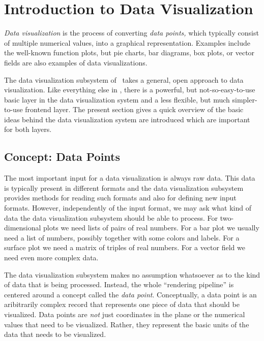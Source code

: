 %
%
%


\section{Introduction to Data Visualization}


\emph{Data visualization} is the process of converting \emph{data
  points,} which typically consist of multiple numerical values, into
a graphical representation. Examples include the well-known function
plots, but pie charts, bar diagrams, box plots, or vector fields are
also examples of data visualizations.

The data visualization subsystem of \pgfname\ takes a general, open
approach to data visualization. Like everything else in \pgfname,
there is a powerful, but not-so-easy-to-use basic layer in the data
visualization system and a less flexible, but much simpler-to-use
frontend layer. The present section gives a quick overview of the
basic ideas behind the data visualization system are introduced which
are important for both layers.


\subsection{Concept: Data Points}

The most important input for a data visualization is always raw
data. This data is typically present in different formats and the data
visualization subsystem provides methods for reading such formats and
also for defining new input formats. However, independently of the
input format, we may ask what kind of data the data visualization
subsystem should be able to process. For two-dimensional plots we
need lists of pairs of real numbers. For a bar plot we usually need a
list of numbers, possibly together with some colors and labels. For a
surface plot we need a matrix of triples of real numbers. For a vector
field we need even more complex data.

The data visualization subsystem makes no assumption whatsoever as to
the kind of data that is being processed. Instead, the whole
``rendering pipeline'' is centered around a concept called the
\emph{data point}. Conceptually, a data point is an aribitrarily
complex record that represents one piece of data that should be
visualized. Data points are \emph{not} just coordinates in the plane
or the numerical values that need to be visualized. Rather, they
represent the basic units of the data that needs to be visualized.

